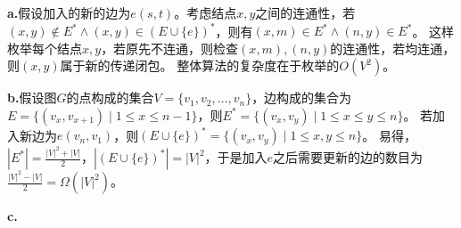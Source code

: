 \begin{solution}
    \textbf{a.}假设加入的新的边为$e(s,t)$。考虑结点$x,y$之间的连通性，若
    $(x,y)\notin E^* \wedge (x,y)\in (E\cup \{e\})^*$，则有$(x,m)\in E^* \wedge (n,y) \in E^*$。
    这样枚举每个结点$x,y$，若原先不连通，则检查$(x,m),(n,y)$的连通性，若均连通，则$(x,y)$属于新的传递闭包。
    整体算法的复杂度在于枚举的$O(V^2)$。

    \textbf{b.}假设图$G$的点构成的集合$V=\{v_1,v_2,\ldots,v_n\}$，边构成的集合为
    $E=\{(v_{x},v_{x+1})\mid 1 \le x \le n-1\}$，则$E^*=\{(v_{x},v_{y})\mid 1\le x \le y\le n\}$。
    若加入新边为$e(v_n,v_1)$，则$(E\cup\{e\})^*=\{(v_{x},v_{y})\mid 1\le x,y\le n\}$。
    易得，$|E^*|=\frac{|V|^2+|V|}{2}$，$|(E\cup\{e\})^*|=|V|^2$，于是加入$e$之后需要更新的边的数目为
    $\frac{|V|^2-|V|}{2}=\Omega(|V|^2)$。

    \textbf{c.}

\end{solution}